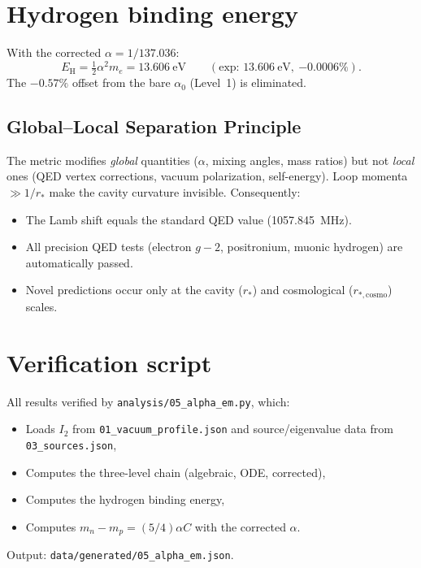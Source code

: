 \documentclass[11pt,letterpaper]{article}
\numberwithin{equation}{section}
\begin{document}
\section{Hydrogen binding energy}
\label{sec:hydrogen}

With the corrected $\alpha = 1/137.036$:
\begin{equation}
  E_{\text{H}} = \tfrac{1}{2}\alpha^2 m_e
  = 13.606~\text{eV}
  \qquad (\text{exp: } 13.606~\text{eV},\ {-0.0006\%}).
\end{equation}
The $-0.57\%$ offset from the bare $\alpha_0$ (Level~1) is eliminated.

\subsection{Global--Local Separation Principle}

The metric modifies \emph{global} quantities ($\alpha$, mixing angles,
mass ratios) but not \emph{local} ones (QED vertex corrections, vacuum
polarization, self-energy).  Loop momenta $\gg 1/r_*$ make the cavity
curvature invisible.  Consequently:
\begin{itemize}
  \item The Lamb shift equals the standard QED value (1057.845~MHz).
  \item All precision QED tests (electron $g-2$, positronium, muonic
    hydrogen) are automatically passed.
  \item Novel predictions occur only at the cavity ($r_*$) and
    cosmological ($r_{*,\text{cosmo}}$) scales.
\end{itemize}

\section{Verification script}
\label{sec:verification}

All results verified by \texttt{analysis/05\_alpha\_em.py}, which:
\begin{itemize}
  \item Loads $I_2$ from \texttt{01\_vacuum\_profile.json} and source/eigenvalue
    data from \texttt{03\_sources.json},
  \item Computes the three-level chain (algebraic, ODE, corrected),
  \item Computes the hydrogen binding energy,
  \item Computes $m_n - m_p = (5/4)\alpha C$ with the corrected $\alpha$.
\end{itemize}

Output: \texttt{data/generated/05\_alpha\_em.json}.
\end{document}
